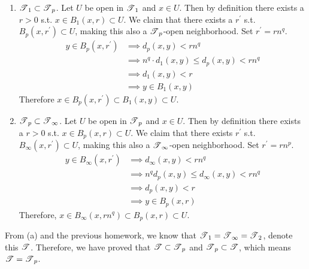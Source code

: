 \begin{solution}[Munkres 20.1.b]
    \begin{enumerate} 
      \item $\T_1 \subset \T_p$. Let $U$ be open in $\T_1$ and $x \in U$. Then by definition there exists a $r > 0$ s.t. $x \in B_1 (x, r) \subset U$. We claim that there exists a $r^\prime$ s.t. $B_p (x, r^\prime) \subset U$, making this also a $\T_p$-open neighborhood. Set $r^\prime = r n^q$. 
      \begin{align}
        y \in B_p (x, r^\prime) & \implies d_p (x, y) < r n^q \\
                                & \implies n^q \cdot d_1 (x, y) \leq d_p (x, y) < r n^q \\
                                & \implies d_1 (x, y) < r \\
                                & \implies y \in B_1 (x, y)
      \end{align}
      Therefore $x \in B_p (x, r^\prime) \subset B_1 (x, y) \subset U$. 

      \item $\T_p \subset \T_\infty$. Let $U$ be open in $\T_p$ and $x \in U$. Then by definition there exists a $r > 0$ s.t. $x \in B_p (x, r) \subset U$. We claim that there exists $r^\prime$ s.t. $B_\infty (x, r^\prime) \subset U$, making this also a $\T_\infty$-open neighborhood. Set $r^\prime = r n^p$. 
      \begin{align}
        y \in B_\infty (x, r^\prime) & \implies d_\infty (x, y) < r n^q \\
                                     & \implies n^q d_p (x, y) \leq d_\infty (x, y) < r n^q  \\
                                     & \implies d_p (x, y) < r \\
                                     & \implies y \in B_p (x, r)
      \end{align}
      Therefore, $x \in B_\infty (x, r n^q) \subset B_p (x, r) \subset U$. 
    \end{enumerate} 

    From (a) and the previous homework, we know that $\T_1 = \T_\infty = \T_2$, denote this $\T$. Therefore, we have proved that $\T \subset \T_p$ and $\T_p \subset \T$, which means $\T = \T_p$. 
  \end{solution}
